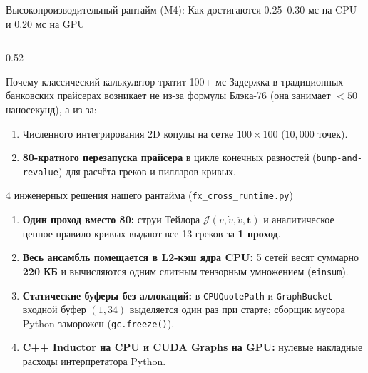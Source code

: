\documentclass[aspectratio=169, 9pt]{beamer}
\begin{document}
\begin{frame}{Высокопроизводительный рантайм (M4): Как достигаются 0.25--0.30 мс на CPU и 0.20 мс на GPU}
  \begin{columns}[T]
    \begin{column}{0.52\textwidth}
      \begin{block}{Почему классический калькулятор тратит 100+ мс}
        Задержка в традиционных банковских прайсерах возникает не из-за формулы Блэка-76 (она занимает $< 50$ наносекунд), а из-за:
        \begin{enumerate}
          \item Численного интегрирования 2D копулы на сетке $100 \times 100$ ($10,000$ точек).
          \item \textbf{80-кратного перезапуска прайсера} в цикле конечных разностей (\texttt{bump-and-revalue}) для расчёта греков и пилларов кривых.
        \end{enumerate}
      \end{block}

      \begin{exampleblock}{4 инженерных решения нашего рантайма (\texttt{fx\_cross\_runtime.py})}
        \begin{enumerate}
          \item \textbf{Один проход вместо 80:} струи Тейлора $\mathcal{J}(v, \dot{v}, \ddot{v}, \bm{t})$ и аналитическое цепное правило кривых выдают все 13 греков за \textbf{1 проход}.
          \item \textbf{Весь ансамбль помещается в L2-кэш ядра CPU:} 5 сетей весят суммарно \textbf{220 КБ} и вычисляются одним слитным тензорным умножением (\texttt{einsum}).
          \item \textbf{Статические буферы без аллокаций:} в \texttt{CPUQuotePath} и \texttt{GraphBucket} входной буфер $(1, 34)$ выделяется один раз при старте; сборщик мусора Python заморожен (\texttt{gc.freeze()}).
          \item \textbf{C++ Inductor на CPU и CUDA Graphs на GPU:} нулевые накладные расходы интерпретатора Python.
        \end{enumerate}
      \end{exampleblock}
    \end{column}


\end{columns}
\end{frame}
\end{document}
